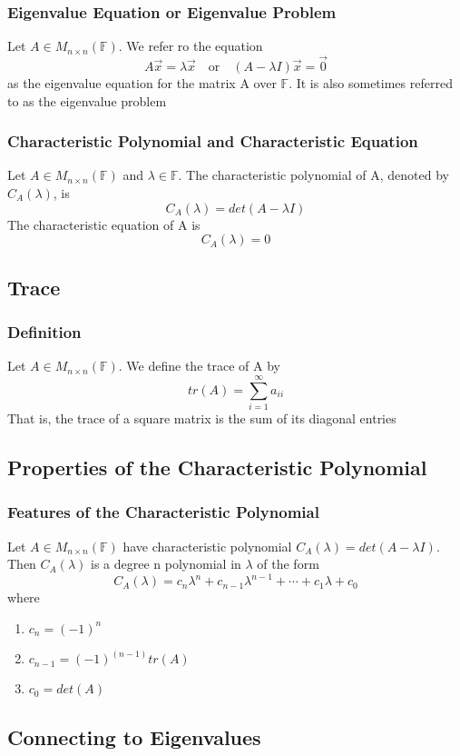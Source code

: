 \documentclass[12pt, letterpaper]{article}
\begin{document}
\subsubsection{Eigenvalue Equation or Eigenvalue Problem}
Let $A\in M_{n\times n}(\mathbb{F})$. We refer ro the equation \[A\vec{x} = \lambda\vec{x}\quad\text{or}\quad (A-\lambda I)\vec{x} = \vec{0}\]
as the eigenvalue equation for the matrix A over $\mathbb{F}$. It is also sometimes referred to as the eigenvalue problem
\subsubsection{Characteristic Polynomial and Characteristic Equation}
Let $A\in M_{n\times n}(\mathbb{F})$ and $\lambda\in\mathbb{F}$. The characteristic polynomial of A, denoted by $C_A(\lambda)$, is 
\[C_A(\lambda) = det(A-\lambda I)\]
The characteristic equation of A is \[C_A(\lambda) = 0\]
\subsection{Trace}
\subsubsection{Definition}
Let $A\in M_{n\times n}(\mathbb{F})$. We define the trace of A by
\[tr(A) = \sum_{i=1}^{\infty}a_{ii}\]
That is, the trace of a square matrix is the sum of its diagonal entries 
\subsection{Properties of the Characteristic Polynomial}
\subsubsection{Features of the Characteristic Polynomial}
Let $A\in M_{n\times n}(\mathbb{F})$ have characteristic polynomial $C_A(\lambda) = det(A-\lambda I)$. 
Then $C_A(\lambda)$ is a degree n polynomial in $\lambda$ of the form 
\[C_A(\lambda) = c_n\lambda^n + c_{n-1}\lambda^{n-1}+\cdots+c_1\lambda + c_0\]
where 
\begin{enumerate}
    \item $c_n = (-1)^n$
    \item $c_{n-1} = (-1)^{(n-1)}tr(A)$
    \item $c_0 = det(A)$
\end{enumerate}
\subsection{Connecting to Eigenvalues}
\end{document}
